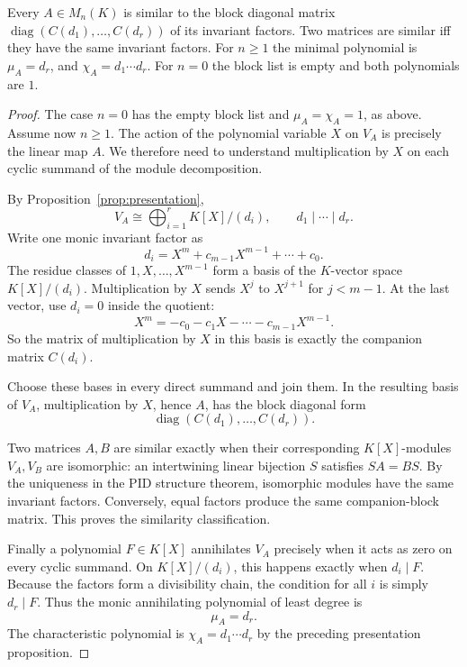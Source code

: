 \begin{theorem}\label{thm:frobenius}
Every $A\in M_n(K)$ is similar to the block diagonal matrix $\operatorname{diag}(C(d_1),\dots,C(d_r))$ of its invariant factors. Two matrices are similar iff they have the same invariant factors. For $n\ge1$ the minimal polynomial is $\mu_A=d_r$, and $\chi_A=d_1\cdots d_r$. For $n=0$ the block list is empty and both polynomials are $1$.
\end{theorem}
\begin{proof}
The case $n=0$ has the empty block list and $\mu_A=\chi_A=1$, as above.
Assume now $n\ge1$. The action of the polynomial variable
$X$ on $V_A$ is precisely the linear
map $A$. We therefore need to understand
multiplication by $X$ on each cyclic
summand of the module decomposition.

By Proposition~\ref{prop:presentation},
\[
V_A\cong
\bigoplus_{i=1}^rK[X]/(d_i),
\qquad d_1\mid\cdots\mid d_r.
\]
Write one monic invariant factor as
\[
d_i=X^m+c_{m-1}X^{m-1}+\cdots+c_0.
\]
The residue classes of
$1,X,\ldots,X^{m-1}$ form a basis
of the $K$-vector space $K[X]/(d_i)$.
Multiplication by $X$ sends
$X^j$ to $X^{j+1}$ for $j<m-1$.
At the last vector, use $d_i=0$
inside the quotient:
\[
X^m=-c_0-c_1X-\cdots-c_{m-1}X^{m-1}.
\]
So the matrix of multiplication
by $X$ in this basis is exactly
the companion matrix $C(d_i)$.

Choose these bases in every direct
summand and join them. In the
resulting basis of $V_A$,
multiplication by $X$, hence $A$,
has the block diagonal form
\[
\boxed{\operatorname{diag}
(C(d_1),\ldots,C(d_r))}.
\]

Two matrices $A,B$ are similar
exactly when their corresponding
$K[X]$-modules $V_A,V_B$ are isomorphic:
an intertwining linear bijection
$S$ satisfies $SA=BS$.
By the uniqueness in the PID
structure theorem, isomorphic
modules have the same invariant
factors. Conversely, equal factors
produce the same companion-block
matrix. This proves the similarity
classification.

Finally a polynomial $F\in K[X]$
annihilates $V_A$ precisely when
it acts as zero on every cyclic summand.
On $K[X]/(d_i)$, this happens exactly
when $d_i\mid F$. Because the factors
form a divisibility chain, the
condition for all $i$ is simply
$d_r\mid F$. Thus the monic
annihilating polynomial of least
degree is
\[
\boxed{\mu_A=d_r}.
\]
The characteristic polynomial is
$\boxed{\chi_A=d_1\cdots d_r}$ by
the preceding presentation proposition.
\end{proof}

